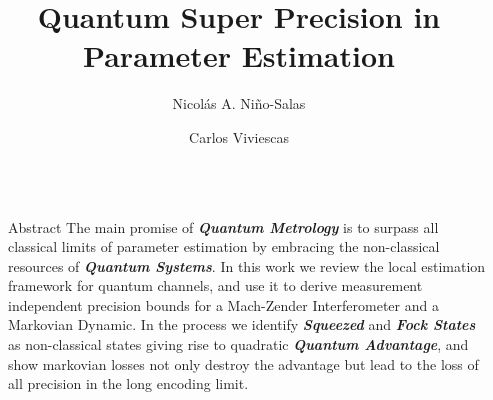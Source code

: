 \documentclass[final]{beamer}
\title{Quantum  Super Precision in Parameter Estimation}
\author{Nicolás A. Niño-Salas  \and Carlos Viviescas }
\institute[shortinst]{Universidad Nacional de Colombia, Sede Bogotá }
\newlength{\sepwidth}
\newlength{\colwidth}
\newcommand{\separatorcolumn}{\begin{column}{\sepwidth}\end{column}}
\begin{document}
\begin{frame}[t]
\begin{columns}[t]
\separatorcolumn

\begin{column}{\colwidth}

  \begin{block}{Abstract}
    The main promise of \textit{\textbf{Quantum Metrology}} is to surpass all classical limits of parameter estimation
    by embracing the non-classical resources of \textbf{\textit{Quantum
        Systems}}.
    In this work we review the local estimation framework for quantum
    channels, and use it to derive measurement
    independent precision bounds for a Mach-Zender Interferometer and a Markovian Dynamic.
    In the process we identify \textit{\textbf{Squeezed}} and \textit{\textbf{Fock States}} as  non-classical
    states giving rise to quadratic \textit{\textbf{Quantum Advantage}}, and show markovian losses not only
    destroy  the advantage but lead to the loss of all precision in the long encoding limit.

  \end{block}


\end{column}
\end{columns}
\end{frame}
\end{document}
